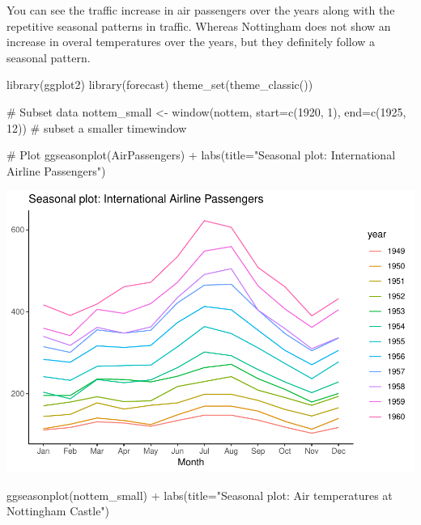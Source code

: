 \documentclass[a4paper]{article}
\newenvironment{Shaded}{}{}
\newcommand{\KeywordTok}[1]{\textcolor[rgb]{0.00,0.00,1.00}{#1}}
\newcommand{\DataTypeTok}[1]{#1}
\newcommand{\DecValTok}[1]{#1}
\newcommand{\StringTok}[1]{\textcolor[rgb]{0.00,0.50,0.50}{#1}}
\newcommand{\CommentTok}[1]{\textcolor[rgb]{0.00,0.50,0.00}{#1}}
\newcommand{\OperatorTok}[1]{#1}
\newcommand{\NormalTok}[1]{#1}
\begin{document}
You can see the traffic increase in air passengers over the years along
with the repetitive seasonal patterns in traffic. Whereas Nottingham
does not show an increase in overal temperatures over the years, but
they definitely follow a seasonal pattern.

\begin{Shaded}
\begin{Highlighting}[]
\KeywordTok{library}\NormalTok{(ggplot2)}
\KeywordTok{library}\NormalTok{(forecast)}
\KeywordTok{theme_set}\NormalTok{(}\KeywordTok{theme_classic}\NormalTok{())}

\CommentTok{# Subset data}
\NormalTok{nottem_small <-}\StringTok{ }\KeywordTok{window}\NormalTok{(nottem, }\DataTypeTok{start=}\KeywordTok{c}\NormalTok{(}\DecValTok{1920}\NormalTok{, }\DecValTok{1}\NormalTok{), }\DataTypeTok{end=}\KeywordTok{c}\NormalTok{(}\DecValTok{1925}\NormalTok{, }\DecValTok{12}\NormalTok{))  }
\CommentTok{# subset a smaller timewindow}

\CommentTok{# Plot}
\KeywordTok{ggseasonplot}\NormalTok{(AirPassengers) }\OperatorTok{+}\StringTok{ }\KeywordTok{labs}\NormalTok{(}\DataTypeTok{title=}\StringTok{"Seasonal plot: International Airline Passengers"}\NormalTok{)}
\end{Highlighting}
\end{Shaded}

\includegraphics{M24-ggplot2_Gallery_files/figure-latex/unnamed-chunk-52-1.pdf}

\newpage  

\begin{Shaded}
\begin{Highlighting}[]
\KeywordTok{ggseasonplot}\NormalTok{(nottem_small) }\OperatorTok{+}\StringTok{ }\KeywordTok{labs}\NormalTok{(}\DataTypeTok{title=}\StringTok{"Seasonal plot: Air temperatures at Nottingham Castle"}\NormalTok{)}
\end{Highlighting}
\end{Shaded}
\end{document}
